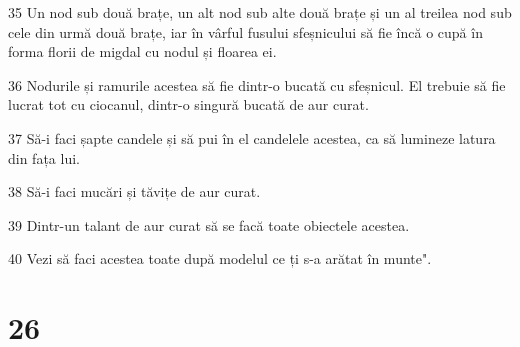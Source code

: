 \par 35 Un nod sub două brațe, un alt nod sub alte două brațe și un al treilea nod sub cele din urmă două brațe, iar în vârful fusului sfeșnicului să fie încă o cupă în forma florii de migdal cu nodul și floarea ei.
\par 36 Nodurile și ramurile acestea să fie dintr-o bucată cu sfeșnicul. El trebuie să fie lucrat tot cu ciocanul, dintr-o singură bucată de aur curat.
\par 37 Să-i faci șapte candele și să pui în el candelele acestea, ca să lumineze latura din fața lui.
\par 38 Să-i faci mucări și tăvițe de aur curat.
\par 39 Dintr-un talant de aur curat să se facă toate obiectele acestea.
\par 40 Vezi să faci acestea toate după modelul ce ți s-a arătat în munte".

\chapter{26}

